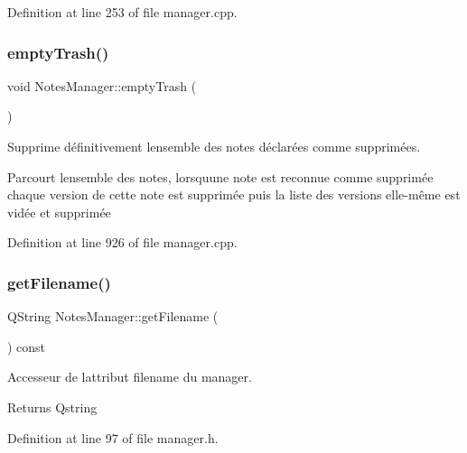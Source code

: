Definition at line 253 of file manager.\+cpp.

\mbox{\label{class_notes_manager_a84e962ad7fa999cbb687fb43c1b3bab4}} 
\subsubsection{\texorpdfstring{empty\+Trash()}{emptyTrash()}}
{\footnotesize\ttfamily void Notes\+Manager\+::empty\+Trash (\begin{DoxyParamCaption}{ }\end{DoxyParamCaption})}



Supprime définitivement l\textquotesingle{}ensemble des notes déclarées comme supprimées. 

Parcourt l\textquotesingle{}ensemble des notes, lorsqu\textquotesingle{}une note est reconnue comme supprimée chaque version de cette note est supprimée puis la liste des versions elle-\/même est vidée et supprimée 

Definition at line 926 of file manager.\+cpp.

\mbox{\label{class_notes_manager_a566cbb0dd7b606ec34629a2aa8010b73}} 
\subsubsection{\texorpdfstring{get\+Filename()}{getFilename()}}
{\footnotesize\ttfamily Q\+String Notes\+Manager\+::get\+Filename (\begin{DoxyParamCaption}{ }\end{DoxyParamCaption}) const\hspace{0.3cm}{\ttfamily [inline]}}



Accesseur de l\textquotesingle{}attribut filename du manager. 

\begin{DoxyReturn}{Returns}
Qstring 
\end{DoxyReturn}


Definition at line 97 of file manager.\+h.

\mbox{\label{class_notes_manager_ac85019776c1e8653665e24abc9d8001d}} 
